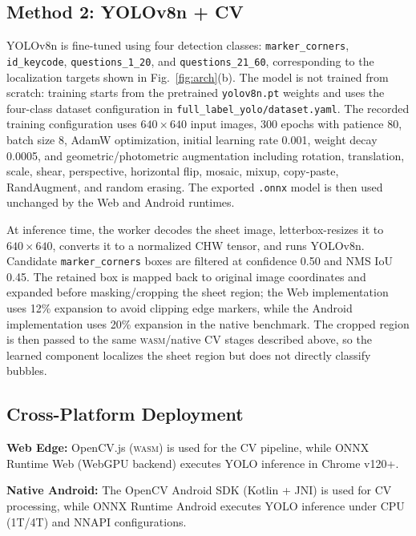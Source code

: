 \documentclass[conference]{IEEEtran}
\newcommand{\wasm}{\textsc{wasm}}
\begin{document}
\subsection{Method 2: YOLOv8n + CV}

YOLOv8n is fine-tuned using four detection classes: \texttt{marker\_corners}, \texttt{id\_keycode}, \texttt{questions\_1\_20}, and \texttt{questions\_21\_60}, corresponding to the localization targets shown in Fig.~\ref{fig:arch}(b). The model is not trained from scratch: training starts from the pretrained \texttt{yolov8n.pt} weights and uses the four-class dataset configuration in \texttt{full\_label\_yolo/dataset.yaml}. The recorded training configuration uses $640\times640$ input images, 300 epochs with patience 80, batch size 8, AdamW optimization, initial learning rate 0.001, weight decay 0.0005, and geometric/photometric augmentation including rotation, translation, scale, shear, perspective, horizontal flip, mosaic, mixup, copy-paste, RandAugment, and random erasing. The exported \texttt{.onnx} model is then used unchanged by the Web and Android runtimes.

At inference time, the worker decodes the sheet image, letterbox-resizes it to $640\times640$, converts it to a normalized CHW tensor, and runs YOLOv8n. Candidate \texttt{marker\_corners} boxes are filtered at confidence 0.50 and NMS IoU 0.45. The retained box is mapped back to original image coordinates and expanded before masking/cropping the sheet region; the Web implementation uses 12\% expansion to avoid clipping edge markers, while the Android implementation uses 20\% expansion in the native benchmark. The cropped region is then passed to the same \wasm{}/native CV stages described above, so the learned component localizes the sheet region but does not directly classify bubbles.

\subsection{Cross-Platform Deployment}

\textbf{Web Edge:}
OpenCV.js (\wasm{}) is used for the CV pipeline, while ONNX Runtime Web (WebGPU backend) executes YOLO inference in Chrome v120+.

\textbf{Native Android:}
The OpenCV Android SDK (Kotlin + JNI) is used for CV processing, while ONNX Runtime Android executes YOLO inference under CPU (1T/4T) and NNAPI configurations.
\end{document}
